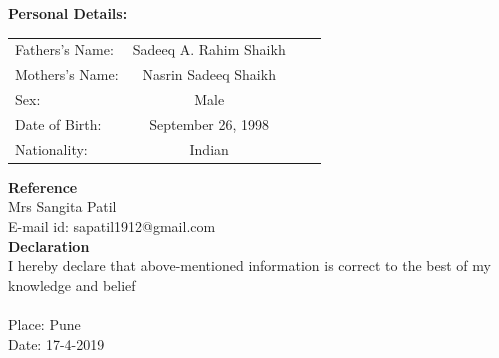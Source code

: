 \documentclass[10pt,twoside,a4paper]{article}
\begin{document}
\noindent
\textbf{Personal Details:}
\begin{flushleft}
\begin{tabular}{l c c l}
Fathers\rq{}s Name: & Sadeeq A. Rahim Shaikh\\
Mothers\rq{}s Name:& Nasrin Sadeeq Shaikh\\
Sex:&Male\\
Date of Birth:& September 26, 1998 \\
Nationality:& Indian\\
\end{tabular}
\end{flushleft}

\noindent
\textbf{Reference}
\\
Mrs Sangita Patil\\
E-mail id: sapatil1912@gmail.com\\

\noindent
\textbf{Declaration}
\\
I hereby declare that above-mentioned information is correct to the best of my knowledge and belief\\
\\
Place: Pune\\
Date: 17-4-2019
\end{document}
